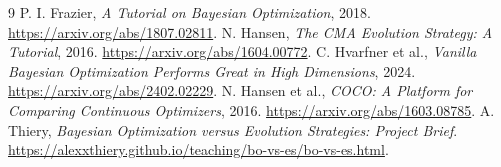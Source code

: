 \documentclass[11pt,a4paper]{article}
\begin{document}
\begin{thebibliography}{9}
 P. I. Frazier, \emph{A Tutorial on Bayesian Optimization}, 2018. \url{https://arxiv.org/abs/1807.02811}.
 N. Hansen, \emph{The CMA Evolution Strategy: A Tutorial}, 2016. \url{https://arxiv.org/abs/1604.00772}.
 C. Hvarfner et al., \emph{Vanilla Bayesian Optimization Performs Great in High Dimensions}, 2024. \url{https://arxiv.org/abs/2402.02229}.
 N. Hansen et al., \emph{COCO: A Platform for Comparing Continuous Optimizers}, 2016. \url{https://arxiv.org/abs/1603.08785}.
 A. Thiery, \emph{Bayesian Optimization versus Evolution Strategies: Project Brief}. \url{https://alexxthiery.github.io/teaching/bo-vs-es/bo-vs-es.html}.
\end{thebibliography}
\end{document}
